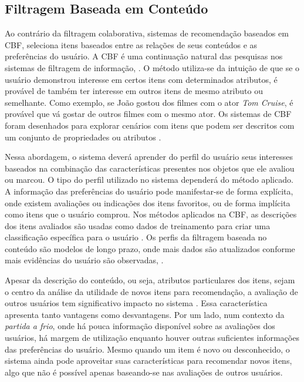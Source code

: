 \subsection{Filtragem Baseada em Conteúdo}

Ao contrário da filtragem colaborativa, sistemas de recomendação baseados em \ac{CBF}, seleciona itens baseados entre as relações de seus conteúdos e as preferências do usuário. A CBF é uma continuação natural das pesquisas nos sistemas de filtragem de informação, \cite{Burke:2002:HRS:586321.586352}.  O método utiliza-se da intuição de que se o usuário demonstrou interesse em certos itens com determinados atributos, é provável de também ter interesse em outros itens de mesmo atributo ou semelhante. Como exemplo, se João gostou dos filmes com o ator \textit{Tom Cruise}, é provável que vá gostar de outros filmes com o mesmo ator. Os sistemas de CBF foram desenhados para explorar cenários com itens que podem ser descritos com um conjunto de propriedades ou atributos \citep{Aggarwal2016}.

Nessa abordagem, o sistema deverá aprender do perfil do usuário seus interesses baseados na combinação das características presentes nos objetos que ele avaliou ou marcou.  O tipo do perfil utilizado no sistema dependerá do método aplicado. A informação das preferências do usuário pode manifestar-se de forma explícita, onde existem avaliações ou indicações dos itens favoritos, ou de forma implícita como itens que o usuário comprou. Nos métodos aplicados na CBF, as descrições dos itens avaliados são usadas como dados de treinamento para criar uma classificação específica para o usuário \citep{Aggarwal2016}. Os perfis da filtragem baseada no conteúdo são modelos de longo prazo, onde mais dados são atualizados conforme mais evidências do usuário são observadas, \cite{Burke:2002:HRS:586321.586352}.

Apesar da descrição do conteúdo, ou seja, atributos particulares dos itens, sejam o centro da análise da utilidade de novos itens para recomendação, a avaliação de outros usuários tem significativo impacto no sistema \citep{Aggarwal2016}. Essa característica apresenta tanto vantagens como desvantagens. Por um lado, num contexto da \textit{partida a frio}, onde há pouca informação disponível sobre as avaliações dos usuários, há margem de utilização enquanto houver outras suficientes informações das preferências do usuário. Mesmo quando um item é novo ou desconhecido, o sistema ainda pode aproveitar suas características para recomendar novos itens, algo que não é possível apenas baseando-se nas avaliações de outros usuários. 

